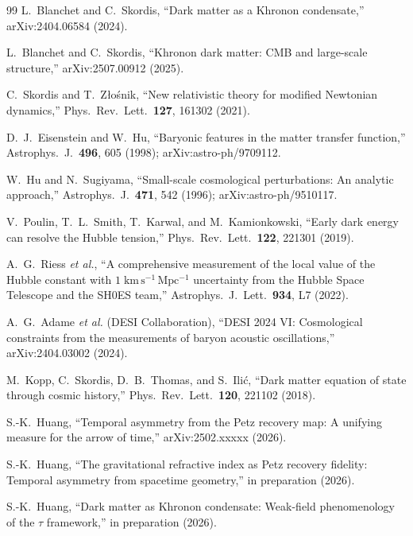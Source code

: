 \documentclass[prl,twocolumn,superscriptaddress,longbibliography]{revtex4-2}
\begin{document}
\begin{thebibliography}{99}
L.~Blanchet and C.~Skordis,
``Dark matter as a Khronon condensate,''
arXiv:2404.06584 (2024).

L.~Blanchet and C.~Skordis,
``Khronon dark matter: CMB and large-scale structure,''
arXiv:2507.00912 (2025).

C.~Skordis and T.~Z\l o\'snik,
``New relativistic theory for modified Newtonian
dynamics,''
Phys.\ Rev.\ Lett.\ \textbf{127}, 161302 (2021).

D.~J.~Eisenstein and W.~Hu,
``Baryonic features in the matter transfer function,''
Astrophys.\ J.\ \textbf{496}, 605 (1998);
arXiv:astro-ph/9709112.

W.~Hu and N.~Sugiyama,
``Small-scale cosmological perturbations: An
analytic approach,''
Astrophys.\ J.\ \textbf{471}, 542 (1996);
arXiv:astro-ph/9510117.

V.~Poulin, T.~L.~Smith, T.~Karwal, and M.~Kamionkowski,
``Early dark energy can resolve the Hubble tension,''
Phys.\ Rev.\ Lett.\ \textbf{122}, 221301 (2019).

A.~G.~Riess \textit{et al.},
``A comprehensive measurement of the local value of the
Hubble constant with $1\;\mathrm{km\,s^{-1}\,Mpc^{-1}}$
uncertainty from the Hubble Space Telescope and the
SH0ES team,''
Astrophys.\ J.\ Lett.\ \textbf{934}, L7 (2022).

A.~G.~Adame \textit{et al.} (DESI Collaboration),
``DESI 2024 VI: Cosmological constraints from the
measurements of baryon acoustic oscillations,''
arXiv:2404.03002 (2024).

M.~Kopp, C.~Skordis, D.~B.~Thomas, and
S.~Ili\'{c},
``Dark matter equation of state through cosmic history,''
Phys.\ Rev.\ Lett.\ \textbf{120}, 221102 (2018).

S.-K.~Huang,
``Temporal asymmetry from the Petz recovery map:
A unifying measure for the arrow of time,''
arXiv:2502.xxxxx (2026).

S.-K.~Huang,
``The gravitational refractive index as Petz recovery
fidelity: Temporal asymmetry from spacetime geometry,''
in preparation (2026).

S.-K.~Huang,
``Dark matter as Khronon condensate: Weak-field
phenomenology of the $\tau$ framework,''
in preparation (2026).

\end{thebibliography}
\end{document}
